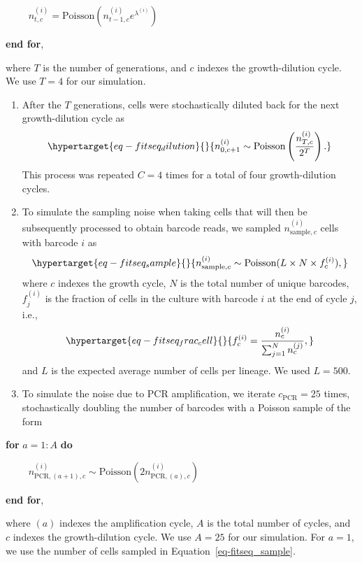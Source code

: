 \documentclass[
]{scrartcl}
\begin{document}
\begin{refsegment}
~~~~
\(n_{t,c}^{(i)} = \text{Poisson}(n_{t-1,c}^{(i)} e^{\lambda^{(i)}})\)

\textbf{end for},

where \(T\) is the number of generations, and \(c\) indexes the
growth-dilution cycle. We use \(T=4\) for our simulation.

\begin{enumerate}
\def\labelenumi{\arabic{enumi}.}
\setcounter{enumi}{3}
\item
  After the \(T\) generations, cells were stochastically diluted back
  for the next growth-dilution cycle as
  \begin{equation}\protect\hypertarget{eq-fitseq_dilution}{}{
  n_{0,c+1}^{(i)} \sim \text{Poisson}
  \left(\frac{n_{T,c}^{(i)}}{2^{T}}\right).
  }\label{eq-fitseq_dilution}\end{equation} This process was repeated
  \(C=4\) times for a total of four growth-dilution cycles.
\item
  To simulate the sampling noise when taking cells that will then be
  subsequently processed to obtain barcode reads, we sampled
  \(n_{\text{sample},c}^{(i)}\) cells with barcode \(i\) as
  \begin{equation}\protect\hypertarget{eq-fitseq_sample}{}{
  n_{\text{sample},c}^{(i)} \sim 
  \text{Poisson}(L \times N \times f_{c}^{(i)}),
  }\label{eq-fitseq_sample}\end{equation} where \(c\) indexes the growth
  cycle, \(N\) is the total number of unique barcodes, \(f_{j}^{(i)}\)
  is the fraction of cells in the culture with barcode \(i\) at the end
  of cycle \(j\), i.e.,
  \begin{equation}\protect\hypertarget{eq-fitseq_frac_cell}{}{
  f_{c}^{(i)} = \frac{n_{c}^{(i)}}
  {\sum_{j=1}^N n_{c}^{(j)}},
  }\label{eq-fitseq_frac_cell}\end{equation} and \(L\) is the expected
  average number of cells per lineage. We used \(L = 500\).
\item
  To simulate the noise due to PCR amplification, we iterate
  \(c_{\text{PCR}} = 25\) times, stochastically doubling the number of
  barcodes with a Poisson sample of the form
\end{enumerate}

\textbf{for} \(a=1:A\) \textbf{do}

~~~~
\(n_{\text{PCR},(a+1),c}^{(i)} \sim \text{Poisson}(2 n_{\text{PCR},(a),c}^{(i)})\)

\textbf{end for},

where \((a)\) indexes the amplification cycle, \(A\) is the total number
of cycles, and \(c\) indexes the growth-dilution cycle. We use \(A=25\)
for our simulation. For \(a = 1\), we use the number of cells sampled in
Equation~\ref{eq-fitseq_sample}.


\end{refsegment}
\end{document}
